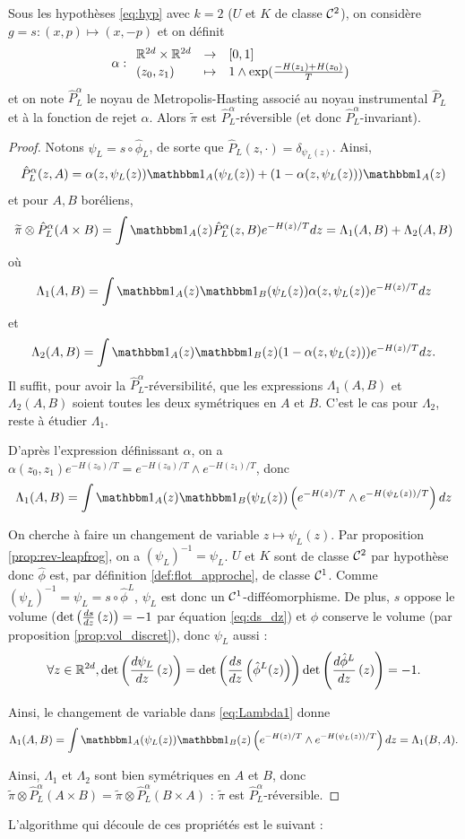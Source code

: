 \documentclass[10pt,a4paper]{article}
\begin{document}
\begin{Prop}[réversibilité]\label{prop:rever_discret}
	Sous les hypothèses \eqref{eq:hyp} avec $k = 2$ ($U$ et $K$ de classe $\mathcal{C}^2$), on considère $g = s : (x, p) \mapsto (x,-p)$ et on définit
	$$
	\alpha : { \begin{array}{lcl} 
	\mathbb{R}^{2d} \times \mathbb{R}^{2d} & \to & [0,1] \\
	(z_0, z_1) & \mapsto & 1 \wedge \exp(\frac{-H(z_1)+H(z_0)}{T})
	 \end{array} }
	$$
	et on note $\hat P_L^\alpha$ le noyau de Metropolis-Hasting associé au noyau instrumental $\hat P_L$ et à la fonction de rejet $\alpha$. Alors $\widetilde \pi$ est $\hat P_L^\alpha$-réversible (et donc $\hat P_L^\alpha$-invariant). 
\end{Prop}
\begin{proof}
	Notons $\psi_L = s \circ \hat \phi_L$, de sorte que $\hat P_L(z,\cdot) = \delta_{\psi_L(z)}$. Ainsi,
	$$
	\hat P_L^\alpha(z,A) = \alpha(z,\psi_L(z)) \ind_A(\psi_L(z)) + (1-\alpha(z,\psi_L(z))) \ind_A(z)
	$$
	et pour $A,B$ boréliens,
	$$
	\widetilde \pi \otimes \hat P_L^\alpha (A \times B)
	=
	\int \ind_A(z) \hat P_L^\alpha(z,B) e^{-H(z)/T} dz
	=
	\Lambda_1(A,B) + \Lambda_2(A,B)
	$$
	où
	$$
	\Lambda_1(A,B) = \int \ind_A(z) \ind_B(\psi_L(z)) \alpha(z,\psi_L(z)) e^{-H(z)/T} dz
	$$
	et
	$$
	\Lambda_2(A,B) = \int \ind_A(z) \ind_B(z) (1-\alpha(z,\psi_L(z))) e^{-H(z)/T} dz.
	$$
	Il suffit, pour avoir la $\hat P_L^\alpha$-réversibilité, que les expressions $\Lambda_1(A,B)$ et $\Lambda_2(A,B)$ soient toutes les deux symétriques en $A$ et $B$. C'est le cas pour $\Lambda_2$, reste à étudier $\Lambda_1$.

	D'après l'expression définissant $\alpha$, on a $\alpha(z_0,z_1) e^{-H(z_0)/T} = e^{-H(z_0)/T} \wedge e^{-H(z_1)/T}$, donc
	\begin{equation}\label{eq:Lambda1}
	\Lambda_1(A,B) = \int \ind_A(z) \ind_B(\psi_L(z)) \left( e^{-H(z)/T} \wedge e^{-H(\psi_L(z))/T} \right) dz
	\end{equation}

	On cherche à faire un changement de variable $z \mapsto \psi_L(z)$. Par proposition \ref{prop:rev-leapfrog}, on a $(\psi_L)^{-1} = \psi_L$. $U$ et $K$ sont de classe $\mathcal{C}^2$ par hypothèse donc $\hat \phi$ est, par définition \ref{def:flot_approche}, de classe $\mathcal{C}^1$. Comme $(\psi_L)^{-1} = \psi_L = s \circ \hat \phi^L$, $\psi_L$ est donc un $\mathcal{C}^1$-difféomorphisme. De plus, $s$ oppose le volume ($\det \left( \frac{d s}{d z} \left( z \right) \right) = -1$ par équation \eqref{eq:ds_dz}) et $\hat \phi$ conserve le volume (par proposition \ref{prop:vol_discret}), donc $\psi_L$ aussi :
	$$
	\forall z \in \mathbb{R}^{2d}, \det \left( \frac{d \psi_L}{d z} \left( z \right) \right) = \det \left( \frac{d s}{d z} \left( \hat \phi^L(z) \right) \right) \det \left( \frac{d \hat \phi^L}{d z} \left( z \right) \right) = -1.
	$$

	Ainsi, le changement de variable dans \eqref{eq:Lambda1} donne
	$$
	\Lambda_1(A,B) = \int \ind_A(\psi_L(z)) \ind_B(z) \left( e^{-H(z)/T} \wedge e^{-H(\psi_L(z))/T} \right) dz = \Lambda_1(B,A).
	$$

	Ainsi, $\Lambda_1$ et $\Lambda_2$ sont bien symétriques en $A$ et $B$, donc $\widetilde \pi \otimes \hat P_L^\alpha (A \times B) = \widetilde \pi \otimes \hat P_L^\alpha (B \times A)$ : $\widetilde \pi$ est $\hat P_L^\alpha$-réversible.
\end{proof}
L'algorithme qui découle de ces propriétés est le suivant :
\end{document}
